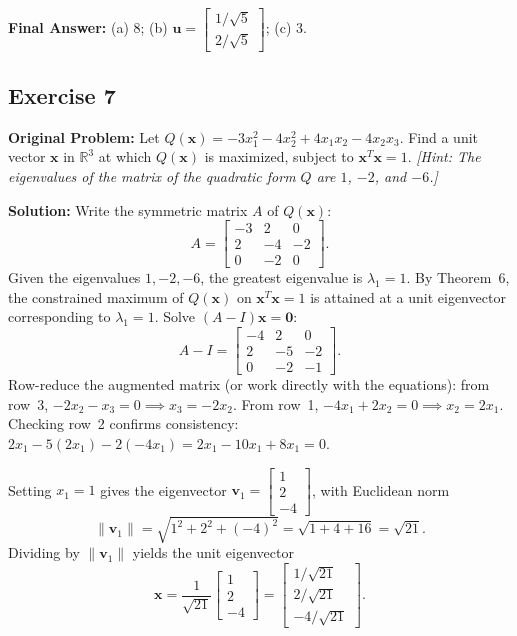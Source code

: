 \documentclass[11pt, letterpaper]{article}
\theoremstyle{definition}
\theoremstyle{remark}
\newcommand{\R}{\mathbb{R}}
\begin{document}
\textbf{Final Answer:} (a) $8$; (b) $\mathbf{u} = \begin{bmatrix} 1/\sqrt{5} \\ 2/\sqrt{5} \end{bmatrix}$; (c) $3$.

\subsection{Exercise 7}
\textbf{Original Problem:} Let $Q(\mathbf{x}) = -3x_1^2 - 4x_2^2 + 4x_1x_2 - 4x_2x_3$. Find a unit vector $\mathbf{x}$ in $\R^3$ at which $Q(\mathbf{x})$ is maximized, subject to $\mathbf{x}^T \mathbf{x} = 1$. \emph{[Hint: The eigenvalues of the matrix of the quadratic form $Q$ are $1$, $-2$, and $-6$.]}

\textbf{Solution:}
Write the symmetric matrix $A$ of $Q(\mathbf{x})$:
\[
A = \begin{bmatrix} -3 & 2 & 0 \\ 2 & -4 & -2 \\ 0 & -2 & 0 \end{bmatrix}.
\]
Given the eigenvalues $1, -2, -6$, the greatest eigenvalue is $\lambda_1 = 1$. By Theorem~6, the constrained maximum of $Q(\mathbf{x})$ on $\mathbf{x}^T \mathbf{x} = 1$ is attained at a unit eigenvector corresponding to $\lambda_1 = 1$. Solve $(A - I)\mathbf{x} = \mathbf{0}$:
\[
A - I = \begin{bmatrix} -4 & 2 & 0 \\ 2 & -5 & -2 \\ 0 & -2 & -1 \end{bmatrix}.
\]
Row-reduce the augmented matrix (or work directly with the equations): from row~3, $-2x_2 - x_3 = 0 \implies x_3 = -2x_2$. From row~1, $-4x_1 + 2x_2 = 0 \implies x_2 = 2x_1$. Checking row~2 confirms consistency: $2x_1 - 5(2x_1) - 2(-4x_1) = 2x_1 - 10x_1 + 8x_1 = 0$.

Setting $x_1 = 1$ gives the eigenvector $\mathbf{v}_1 = \begin{bmatrix} 1 \\ 2 \\ -4 \end{bmatrix}$, with Euclidean norm
\[
\|\mathbf{v}_1\| = \sqrt{1^2 + 2^2 + (-4)^2} = \sqrt{1 + 4 + 16} = \sqrt{21}.
\]
Dividing by $\|\mathbf{v}_1\|$ yields the unit eigenvector
\[
\mathbf{x} = \frac{1}{\sqrt{21}} \begin{bmatrix} 1 \\ 2 \\ -4 \end{bmatrix} = \begin{bmatrix} 1/\sqrt{21} \\ 2/\sqrt{21} \\ -4/\sqrt{21} \end{bmatrix}.
\]
\end{document}
